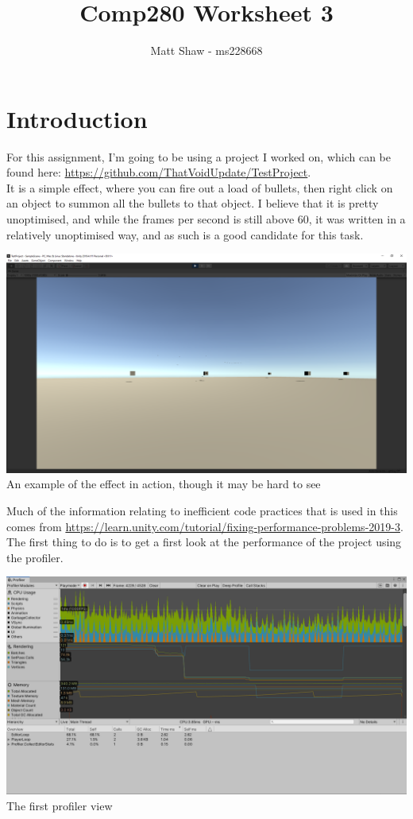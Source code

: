 \documentclass{article}
\title{Comp280 Worksheet 3}
\author{Matt Shaw - ms228668}
\begin{document}
\maketitle

\section{Introduction}
For this assignment, I'm going to be using a project I worked on, which can be found here: \url{https://github.com/ThatVoidUpdate/TestProject}. \\
It is a simple effect, where you can fire out a load of bullets, then right click on an object to summon all the bullets to that object. I believe that it is pretty unoptimised, and while the frames per second is still above 60, it was written in a relatively unoptimised way, and as such is a good candidate for this task.
\begin{center}
    \includegraphics[width=\textwidth]{Images/Example.png}\\
    An example of the effect in action, though it may be hard to see\\
\end{center}
Much of the information relating to inefficient code practices that is used in this comes from \url{https://learn.unity.com/tutorial/fixing-performance-problems-2019-3}.
The first thing to do is to get a first look at the performance of the project using the profiler.
\begin{center}
    \includegraphics[width=\textwidth]{Images/FirstProfile.png}
    The first profiler view
\end{center}
\end{document}
